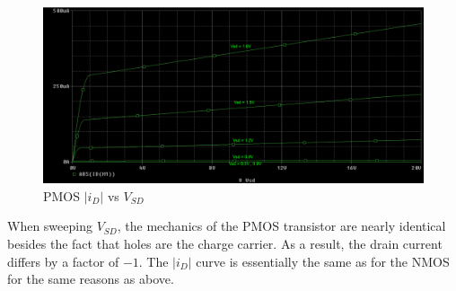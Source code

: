 \FloatBarrier

\begin{figure}[h!]
	\centering
	\includegraphics[scale=0.75]{./images/circuit2_vsd_sweep_abs.PNG}
	\caption{PMOS $|i_D|$ vs $V_{SD}$}
	\label{fig:circuit2_vsd_sweep_abs}
\end{figure}

\FloatBarrier


When sweeping $V_{SD}$, the mechanics of the PMOS transistor are nearly identical besides the fact that holes are the charge carrier. As a result, the drain current differs by a factor of $-1$. The $|i_D|$ curve is essentially the same as for the NMOS for the same reasons as above.
